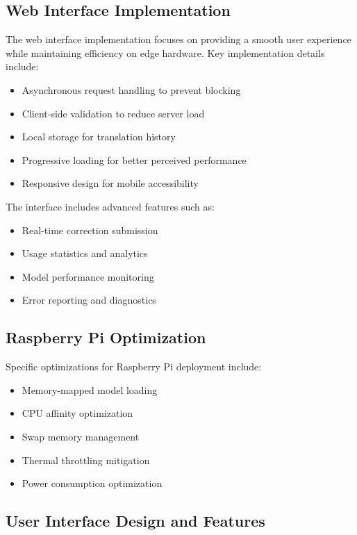 \documentclass[conference]{IEEEtran}
\begin{document}
\subsection{Web Interface Implementation}

The web interface implementation focuses on providing a smooth user experience while maintaining efficiency on edge hardware. Key implementation details include:

\begin{itemize}
    \item Asynchronous request handling to prevent blocking
    \item Client-side validation to reduce server load
    \item Local storage for translation history
    \item Progressive loading for better perceived performance
    \item Responsive design for mobile accessibility
\end{itemize}

The interface includes advanced features such as:

\begin{itemize}
    \item Real-time correction submission
    \item Usage statistics and analytics
    \item Model performance monitoring
    \item Error reporting and diagnostics
\end{itemize}

\subsection{Raspberry Pi Optimization}

Specific optimizations for Raspberry Pi deployment include:

\begin{itemize}
    \item Memory-mapped model loading
    \item CPU affinity optimization
    \item Swap memory management
    \item Thermal throttling mitigation
    \item Power consumption optimization
\end{itemize}

\subsection{User Interface Design and Features}
\end{document}
